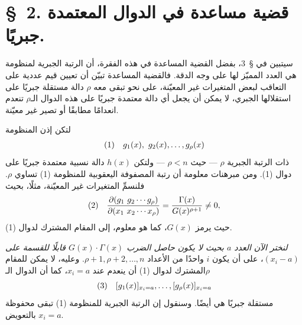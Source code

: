 \documentclass[11pt]{article}
\begin{document}
\section*{\S\ 2. قضية مساعدة في الدوال المعتمدة جبريًا.}

سيتبين في \S\ 3، بفضل القضية المساعدة في هذه الفقرة، أن الرتبة الجبرية لمنظومة هي العدد المميّز لها على وجه الدقة. فالقضية المساعدة تبيّن أن تعيين قيم عددية على التعاقب لبعض المتغيرات غير المعيّنة، على نحو تبقى معه $\rho$ دالة مستقلة جبريًا على استقلالها الجبري، لا يمكن أن يجعل أي دالة معتمدة جبريًا على هذه الدوال الـ$\rho$ تنعدم انعدامًا مطابقًا أو تصير غير معيّنة.

لتكن إذن المنظومة
\[
\begin{array}{@{}r@{\quad}l@{}}
(1)& g_1(x),\ g_2(x),\ldots,g_\rho(x)
\end{array}
\]
ذات الرتبة الجبرية $\rho$ --- حيث $\rho<n$ --- ولتكن $h(x)$ دالة نسبية معتمدة جبريًا على دوال (1). ومن مبرهنات معلومة أن رتبة المصفوفة اليعقوبية للمنظومة (1) تساوي $\rho$. فلنسمِّ المتغيرات غير المعيّنة، مثلًا، بحيث
\[
\begin{array}{@{}r@{\quad}l@{}}
(2)& \displaystyle
\frac{\partial(g_1\ g_2\cdots g_\rho)}{\partial(x_1\ x_2\cdots x_\rho)}
=\frac{\Gamma(x)}{G(x)^{\rho+1}}\ne0,
\end{array}
\]
حيث يرمز $G(x)$، كما هو معلوم، إلى المقام المشترك لدوال (1).

\emph{لنختر الآن العدد $a$ بحيث لا يكون حاصل الضرب $G(x)\cdot\Gamma(x)$ قابلًا للقسمة على $(x_i-a)$}، على أن يكون $i$ واحدًا من الأعداد $\rho+1,\rho+2,\ldots,n$. وعليه، لا يمكن للمقام المشترك لدوال (1) أن ينعدم عند $x_i=a$، كما أن الدوال الـ$\rho$
\[
\begin{array}{@{}r@{\quad}l@{}}
(3)& [g_1(x)]_{x_i=a},\ldots,[g_\rho(x)]_{x_i=a}
\end{array}
\]
مستقلة جبريًا هي أيضًا. وسنقول إن الرتبة الجبرية للمنظومة (1) تبقى محفوظة بالتعويض $x_i=a$.
\end{document}
